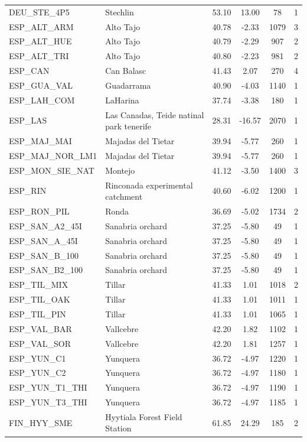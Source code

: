 \documentclass[11pt,twoside]{reedthesis}
\begin{document}
\begin{longtable}[t]{l>{\centering\arraybackslash}p{12em}cccc}
DEU\_STE\_4P5 & Stechlin & 53.10 & 13.00 & 78 & 1\\
ESP\_ALT\_ARM & Alto Tajo & 40.78 & -2.33 & 1079 & 3\\
ESP\_ALT\_HUE & Alto Tajo & 40.79 & -2.29 & 907 & 2\\
ESP\_ALT\_TRI & Alto Tajo & 40.80 & -2.23 & 981 & 2\\
ESP\_CAN & Can Balasc & 41.43 & 2.07 & 270 & 4\\
ESP\_GUA\_VAL & Guadarrama & 40.90 & -4.03 & 1140 & 1\\
ESP\_LAH\_COM & LaHarina & 37.74 & -3.38 & 180 & 1\\
ESP\_LAS & Las Canadas, Teide natinal park tenerife & 28.31 & -16.57 & 2070 & 1\\
ESP\_MAJ\_MAI & Majadas del Tietar & 39.94 & -5.77 & 260 & 1\\
ESP\_MAJ\_NOR\_LM1 & Majadas del Tietar & 39.94 & -5.77 & 260 & 1\\
ESP\_MON\_SIE\_NAT & Montejo & 41.12 & -3.50 & 1400 & 3\\
ESP\_RIN & Rinconada experimental catchment & 40.60 & -6.02 & 1200 & 1\\
ESP\_RON\_PIL & Ronda & 36.69 & -5.02 & 1734 & 2\\
ESP\_SAN\_A2\_45I & Sanabria orchard & 37.25 & -5.80 & 49 & 1\\
ESP\_SAN\_A\_45I & Sanabria orchard & 37.25 & -5.80 & 49 & 1\\
ESP\_SAN\_B\_100 & Sanabria orchard & 37.25 & -5.80 & 49 & 1\\
ESP\_SAN\_B2\_100 & Sanabria orchard & 37.25 & -5.80 & 49 & 1\\
ESP\_TIL\_MIX & Tillar & 41.33 & 1.01 & 1018 & 2\\
ESP\_TIL\_OAK & Tillar & 41.33 & 1.01 & 1011 & 1\\
ESP\_TIL\_PIN & Tillar & 41.33 & 1.01 & 1065 & 1\\
ESP\_VAL\_BAR & Vallcebre & 42.20 & 1.82 & 1102 & 1\\
ESP\_VAL\_SOR & Vallcebre & 42.20 & 1.81 & 1257 & 1\\
ESP\_YUN\_C1 & Yunquera & 36.72 & -4.97 & 1220 & 1\\
ESP\_YUN\_C2 & Yunquera & 36.72 & -4.97 & 1180 & 1\\
ESP\_YUN\_T1\_THI & Yunquera & 36.72 & -4.97 & 1190 & 1\\
ESP\_YUN\_T3\_THI & Yunquera & 36.72 & -4.97 & 1185 & 1\\
FIN\_HYY\_SME & Hyytiala Forest Field Station & 61.85 & 24.29 & 185 & 2\\

\end{longtable}
\end{document}
